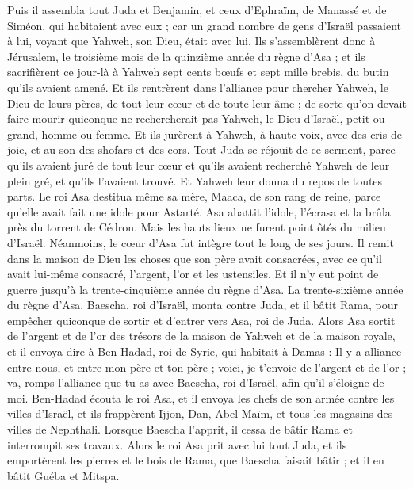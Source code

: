 \begin{multicols}{2}
Puis il assembla tout Juda et Benjamin, et ceux d'Ephraïm, de Manassé et de Siméon, qui habitaient avec eux ; car un grand nombre de gens d'Israël passaient à lui, voyant que Yahweh, son Dieu, était avec lui.
Ils s'assemblèrent donc à Jérusalem, le troisième mois de la quinzième année du règne d'Asa ;
et ils sacrifièrent ce jour-là à Yahweh sept cents bœufs et sept mille brebis, du butin qu'ils avaient amené.
Et ils rentrèrent dans l'alliance pour chercher Yahweh, le Dieu de leurs pères, de tout leur cœur et de toute leur âme ;
de sorte qu'on devait faire mourir quiconque ne rechercherait pas Yahweh, le Dieu d'Israël, petit ou grand, homme ou femme.
Et ils jurèrent à Yahweh, à haute voix, avec des cris de joie, et au son des shofars et des cors.
Tout Juda se réjouit de ce serment, parce qu'ils avaient juré de tout leur cœur et qu'ils avaient recherché Yahweh de leur plein gré, et qu'ils l'avaient trouvé. Et Yahweh leur donna du repos de toutes parts.
Le roi Asa destitua même sa mère, Maaca, de son rang de reine, parce qu'elle avait fait une idole pour Astarté. Asa abattit l'idole, l'écrasa et la brûla près du torrent de Cédron.
Mais les hauts lieux ne furent point ôtés du milieu d'Israël. Néanmoins, le cœur d'Asa fut intègre tout le long de ses jours.
Il remit dans la maison de Dieu les choses que son père avait consacrées, avec ce qu'il avait lui-même consacré, l'argent, l'or et les ustensiles.
Et il n'y eut point de guerre jusqu'à la trente-cinquième année du règne d'Asa.
\VerseOne{}La trente-sixième année du règne d'Asa, Baescha, roi d'Israël, monta contre Juda, et il bâtit Rama, pour empêcher quiconque de sortir et d'entrer vers Asa, roi de Juda.
Alors Asa sortit de l'argent et de l'or des trésors de la maison de Yahweh et de la maison royale, et il envoya dire à Ben-Hadad, roi de Syrie, qui habitait à Damas :
Il y a alliance entre nous, et entre mon père et ton père ; voici, je t'envoie de l'argent et de l'or ; va, romps l'alliance que tu as avec Baescha, roi d'Israël, afin qu'il s'éloigne de moi.
Ben-Hadad écouta le roi Asa, et il envoya les chefs de son armée contre les villes d'Israël, et ils frappèrent Ijjon, Dan, Abel-Maïm, et tous les magasins des villes de Nephthali.
Lorsque Baescha l'apprit, il cessa de bâtir Rama et interrompit ses travaux.
Alors le roi Asa prit avec lui tout Juda, et ils emportèrent les pierres et le bois de Rama, que Baescha faisait bâtir ; et il en bâtit Guéba et Mitspa.

\end{multicols}
